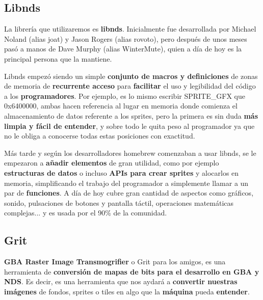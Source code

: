 \vspace{0.5cm}


\subsection{Libnds}

La librería que utilizaremos es\textbf{ libnds}. Inicialmente fue desarrollada por Michael Noland (alias joat) y Jason Rogers (alias rovoto), pero después de unos meses pasó a manos de Dave Murphy (alias WinterMute), quien a día de hoy es la principal persona que la mantiene.

\vspace{0.5cm}

Libnds empezó siendo un simple \textbf{conjunto de macros y definiciones} de zonas de memoria de \textbf{recurrente acceso} para \textbf{facilitar} el uso y legibilidad del código a los \textbf{programadores}. Por ejemplo, es lo mismo escribir SPRITE\_GFX que 0x6400000, ambas hacen referencia al lugar en memoria donde comienza el almacenamiento de datos referente a los sprites, pero la primera es sin duda \textbf{más limpia y fácil de entender}, y sobre todo le quita peso al programador ya que no le obliga a conocerse todas estas posiciones con exactitud.

\vspace{0.5cm}

Más tarde y según los desarrolladores homebrew comenzaban a usar libnds, se le empezaron a \textbf{añadir elementos} de gran utilidad, como por ejemplo \textbf{estructuras de datos} o incluso \textbf{APIs para crear sprites} y alocarlos en memoria, simplificando el trabajo del programador a simplemente llamar a un par de \textbf{funciones}. A día de hoy cubre gran cantidad de aspectos como gráficos, sonido, pulsaciones de botones y pantalla táctil, operaciones matemáticas complejas... y es usada por el 90\%  de la comunidad.

\vspace{1cm}

\subsection{Grit}

\textbf{GBA Raster Image Transmogrifier} o Grit para los amigos, es una herramienta de \textbf{conversión de mapas de bits para el desarrollo en GBA y NDS}. Es decir, es una herramienta que nos aydará a \textbf{convertir nuestras imágenes} de fondos, sprites o tiles en algo que la \textbf{máquina} pueda \textbf{entender}.

